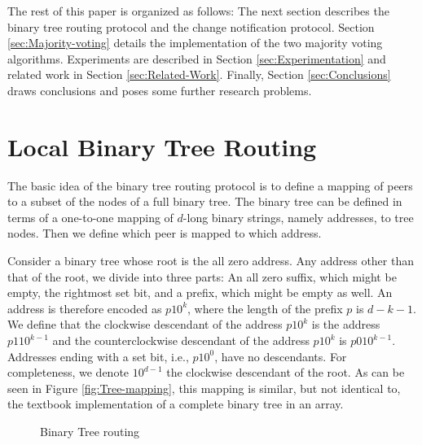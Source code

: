 \documentclass[12pt,english,journal]{elsarticle}
\numberwithin{equation}{section}
\numberwithin{figure}{section}
\theoremstyle{plain}
\theoremstyle{plain}
\begin{document}
The rest of this paper is organized as follows: The next section describes
the binary tree routing protocol and the change notification protocol.
Section \ref{sec:Majority-voting} details the implementation of the
two majority voting algorithms. Experiments are described in Section
\ref{sec:Experimentation} and related work in Section \ref{sec:Related-Work}.
Finally, Section \ref{sec:Conclusions} draws conclusions and poses
some further research problems.


\section{\label{sec:Binary-Tree-Routing}Local Binary Tree Routing}

The basic idea of the binary tree routing protocol is to define a
mapping of peers to a subset of the nodes of a full binary tree. The
binary tree can be defined in terms of a one-to-one mapping of $d$-long
binary strings, namely addresses, to tree nodes. Then we define which
peer is mapped to which address. 

Consider a binary tree whose root is the all zero address. Any address
other than that of the root, we divide into three parts: An all zero
suffix, which might be empty, the rightmost set bit, and a prefix,
which might be empty as well. An address is therefore encoded as $p10^{k}$,
where the length of the prefix $p$ is $d-k-1$. We define that the
clockwise descendant of the address $p10^{k}$ is the address $p110^{k-1}$
and the counterclockwise descendant of the address $p10^{k}$ is $p010^{k-1}$.
Addresses ending with a set bit, i.e., $p10^{0}$, have no descendants.
For completeness, we denote $10^{d-1}$ the clockwise descendant of
the root. As can be seen in Figure \ref{fig:Tree-mapping}, this mapping
is similar, but not identical to, the textbook implementation of a
complete binary tree in an array.

\begin{figure*}
\caption{Binary Tree routing}


\begin{minipage}[t]{0.5\textwidth}\end{minipage}\begin{minipage}[t]{0.5\textwidth}\end{minipage}
\end{figure*}
\end{document}

